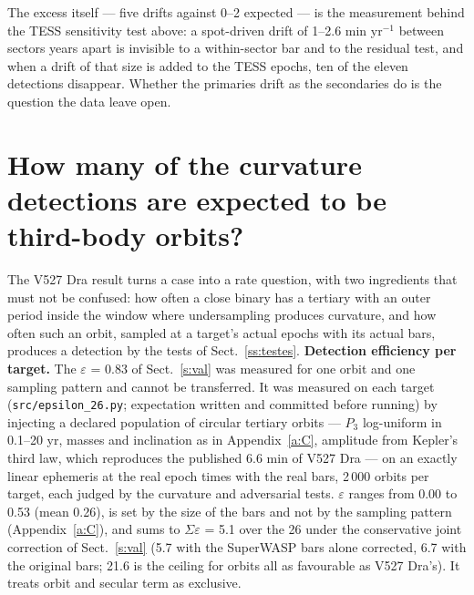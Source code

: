 \documentclass{aa}
\begin{document}
The excess itself --- five drifts against 0--2 expected --- is the measurement behind the TESS sensitivity test above: a spot-driven drift of 1--2.6 min yr$^{-1}$ between sectors years apart is invisible to a within-sector bar and to the residual test, and when a drift of that size is added to the TESS epochs, ten of the eleven detections disappear. Whether the primaries drift as the secondaries do is the question the data leave open.

\section{How many of the curvature detections are expected to be third-body orbits?}\label{s:orb}
The V527 Dra result turns a case into a rate question, with two ingredients that must not be confused: how often a close binary has a tertiary with an outer period inside the window where undersampling produces curvature, and how often such an orbit, sampled at a target's actual epochs with its actual bars, produces a detection by the tests of Sect.~\ref{ss:testes}.
\textbf{Detection efficiency per target.} The $\varepsilon$ = 0.83 of Sect.~\ref{s:val} was measured for one orbit and one sampling pattern and cannot be transferred. It was measured on each target (\texttt{src/epsilon\_26.py}; expectation written and committed before running) by injecting a declared population of circular tertiary orbits --- $P_3$ log-uniform in 0.1--20 yr, masses and inclination as in Appendix~\ref{a:C}, amplitude from Kepler's third law, which reproduces the published 6.6 min of V527 Dra --- on an exactly linear ephemeris at the real epoch times with the real bars, 2\,000 orbits per target, each judged by the curvature and adversarial tests. $\varepsilon$ ranges from 0.00 to 0.53 (mean 0.26), is set by the size of the bars and not by the sampling pattern (Appendix~\ref{a:C}), and sums to $\Sigma\varepsilon$ = 5.1 over the 26 under the conservative joint correction of Sect.~\ref{s:val} (5.7 with the SuperWASP bars alone corrected, 6.7 with the original bars; 21.6 is the ceiling for orbits all as favourable as V527 Dra's). It treats orbit and secular term as exclusive.
\end{document}
